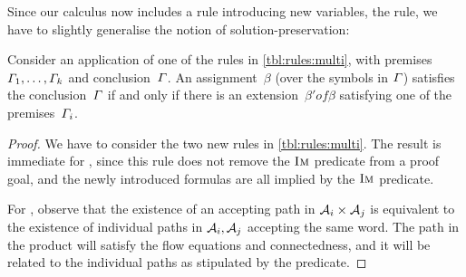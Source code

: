 Since our calculus now includes a rule introducing new variables, the
\Materialise{} rule, we have to slightly generalise the notion of
solution-preservation:
%
\begin{lemma}\label{lma:multi-correct}
  Consider an application of one of the rules in
  \cref{tbl:rules:multi}, with
  premises~$\varGamma_1, \ldots, \varGamma_k$ and
  conclusion~$\varGamma$. An assignment~$\beta$ (over the symbols in
  $\varGamma$) satisfies the conclusion~$\varGamma$ if and only if
  there is an extension~$\beta' of \beta$ satisfying one of the
  premises~$\varGamma_i$.
\end{lemma}

\begin{proof}
  We have to consider the two new rules in \cref{tbl:rules:multi}. The
  result is immediate for \ExpandM{}, since this rule does not remove the
  $\operatorname{\textsc{Im}}$ predicate from a proof goal, and the newly introduced formulas
  are all implied by the $\operatorname{\textsc{Im}}$ predicate.

  For \Materialise{}, observe that the existence of an accepting path
  in $\mathcal{A}_i \times \mathcal{A}_j$ is equivalent to the existence
  of individual paths in $\mathcal{A}_i, \mathcal{A}_j$ accepting the
  same word. The path in the product will satisfy the flow equations
  and connectedness, and it will be related to the individual paths as
  stipulated by the \BindingSum{} predicate.
\end{proof}

